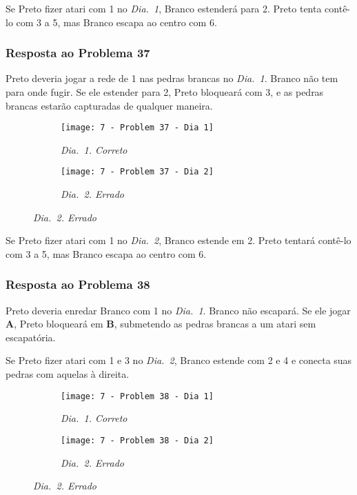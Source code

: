 Se Preto fizer atari com 1 no \emph{Dia.\@~1}, Branco estenderá para 2. Preto tenta contê-lo com 3 a 5, mas Branco escapa ao centro com 6.

\pagebreak

\subsubsection*{Resposta ao Problema 37}

Preto deveria jogar a rede de 1 nas pedras brancas no \emph{Dia.\@~1}. Branco não tem para onde fugir. Se ele estender para 2, Preto bloqueará com 3, e as pedras brancas estarão capturadas de qualquer maneira.

\begin{figure}[h!]
    \centering
    \begin{subfigure}[t]{.425\textwidth}
        \texttt{[image: 7 - Problem 37 - Dia 1]}
        \captionsetup{justification=centering}
        \caption*{\emph{Dia.\@~1. Correto}}
    \end{subfigure}
    \hspace{1cm}
    \begin{subfigure}[t]{.425\textwidth}
        \texttt{[image: 7 - Problem 37 - Dia 2]}
        \captionsetup{justification=centering}
        \caption*{\emph{Dia.\@~2. Errado}}
    \end{subfigure}
\end{figure}

Se Preto fizer atari com 1 no \emph{Dia.\@~2}, Branco estende em 2. Preto tentará contê-lo com 3 a 5, mas Branco escapa ao centro com 6.

\pagebreak

\subsubsection*{Resposta ao Problema 38}

Preto deveria enredar Branco com 1 no \emph{Dia.\@~1}. Branco não escapará. Se ele jogar \textbf{A}, Preto bloqueará em \textbf{B}, submetendo as pedras brancas a um atari sem escapatória.
    
Se Preto fizer atari com 1 e 3 no \emph{Dia.\@~2}, Branco estende com 2 e 4 e conecta suas pedras com aquelas à direita.

\begin{figure}[h!]
    \centering
    \begin{subfigure}[t]{.425\textwidth}
        \texttt{[image: 7 - Problem 38 - Dia 1]}
        \captionsetup{justification=centering}
        \caption*{\emph{Dia.\@~1. Correto}}
    \end{subfigure}
    \hspace{1cm}
    \begin{subfigure}[t]{.425\textwidth}
        \texttt{[image: 7 - Problem 38 - Dia 2]}
        \captionsetup{justification=centering}
        \caption*{\emph{Dia.\@~2. Errado}}
    \end{subfigure}
\end{figure}

